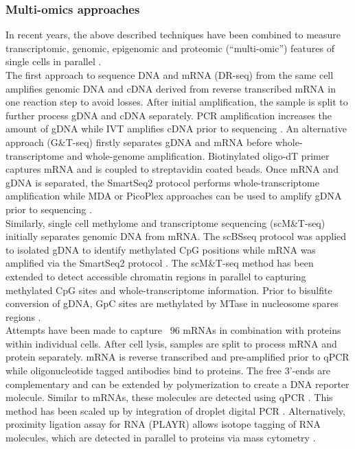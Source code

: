 
\subsubsection{Multi-omics approaches}

In recent years, the above described techniques have been combined to measure transcriptomic, genomic, epigenomic and proteomic (“multi-omic”) features of single cells in parallel \citep{Macaulay2017}. \\
The first approach to sequence DNA and mRNA (DR-seq) from the same cell amplifies genomic DNA and cDNA derived from reverse transcribed mRNA in one reaction step to avoid losses. After initial amplification, the sample is split to further process gDNA and cDNA separately. PCR amplification increases the amount of gDNA while IVT amplifies cDNA prior to sequencing \citep{Dey2015}. An alternative approach (G\&{}T-seq) firstly separates gDNA and mRNA before whole-transcriptome and whole-genome amplification. Biotinylated oligo-dT primer captures mRNA and is coupled to streptavidin coated beads. Once mRNA and gDNA is separated, the SmartSeq2 protocol performs whole-transcriptome amplification while MDA or PicoPlex approaches can be used to amplify gDNA prior to sequencing \citep{Macaulay2015}.\\
Similarly, single cell methylome and transcriptome sequencing (scM\&{}T-seq) initially separates genomic DNA from mRNA. The scBSseq protocol was applied to isolated gDNA to identify methylated CpG positions while mRNA was amplified via the SmartSeq2 protocol \citep{Angermueller2016a}.   
The scM\&{}T-seq method has been extended to detect accessible chromatin regions in parallel to capturing methylated CpG sites and whole-transcriptome information. Prior to bisulfite conversion of gDNA, GpC sites are methylated by MTase in nucleosome spares regions \citep{Pott2017, Clark2018}.\\ 
Attempts have been made to capture ~96 mRNAs in combination with proteins within individual cells. After cell lysis, samples are split to process mRNA and protein separately. mRNA is reverse transcribed and pre-amplified prior to qPCR while oligonucleotide tagged antibodies bind to proteins. The free 3’-ends are complementary and can be extended by polymerization to create a DNA reporter molecule. Similar to mRNAs, these molecules are detected using qPCR \citep{Darmanis2016}. This method has been scaled up by integration of droplet digital PCR \citep{Albayrak2016}. Alternatively, proximity ligation assay for RNA (PLAYR) allows isotope tagging of RNA molecules, which are detected in parallel to proteins via mass cytometry \citep{Frei2016}.

